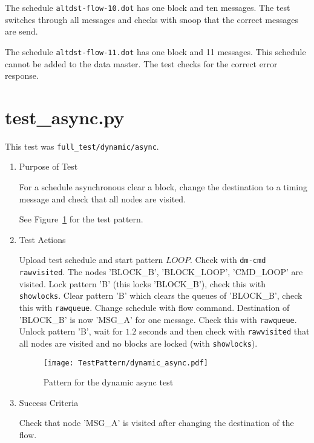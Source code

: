 \documentclass[12pt,a4paper]{report}
\begin{document}
The schedule \texttt{altdst-flow-10.dot} has one block and ten messages.
The test switches through all messages and checks with snoop that the
correct messages are send.

The schedule \texttt{altdst-flow-11.dot} has one block and 11 messages.
This schedule cannot be added to the data master. The test checks for
the correct error response.

\section{test\_async.py}
This test was \texttt{full\_test/dynamic/async}.
\begin{enumerate}
  \item Purpose of Test

  For a schedule asynchronous clear a block, change the destination to
  a timing message and check that all nodes are visited.

  See Figure~\ref{fig:Pattern_for_the_dynamic_async_test} for the test pattern.
  \item Test Actions

  Upload test schedule and start pattern $LOOP$. Check with \texttt{dm-cmd rawvisited}. The
  nodes 'BLOCK\_B', 'BLOCK\_LOOP', 'CMD\_LOOP' are visited. Lock pattern 'B' (this locks 'BLOCK\_B'), check this with
  \texttt{showlocks}. Clear pattern 'B' which clears the queues of 'BLOCK\_B', check this with \texttt{rawqueue}.
  Change schedule with flow command. Destination of 'BLOCK\_B' is now 'MSG\_A' for one message. Check this
  with \texttt{rawqueue}. Unlock pattern 'B', wait for $1.2$ seconds and then check with \texttt{rawvisited} that all
  nodes are visited and no blocks are locked (with \texttt{showlocks}).
    \begin{figure}
        \centering
        \texttt{[image: TestPattern/dynamic\_async.pdf]}
        \caption{Pattern for the dynamic async test}
        \label{fig:Pattern_for_the_dynamic_async_test}
    \end{figure}
  \item Success Criteria

  Check that node 'MSG\_A' is visited after changing the destination of the flow.
\end{enumerate}
\end{document}
